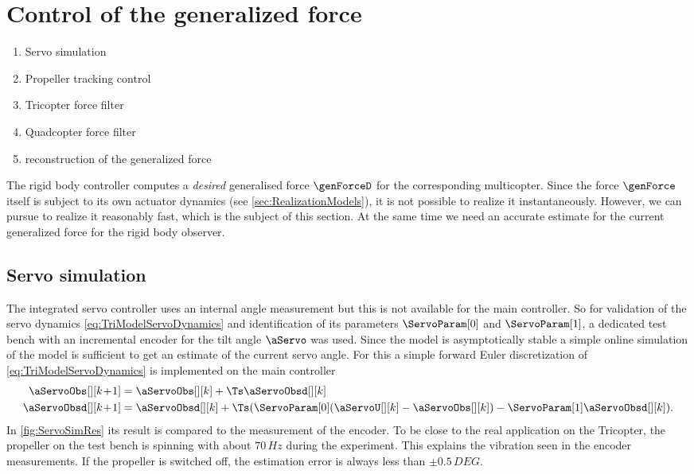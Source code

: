 \section{Control of the generalized force}\label{sec:RealizationForceVectorControl}

\begin{enumerate}
 \item Servo simulation
 \item Propeller tracking control
 \item Tricopter force filter
 \item Quadcopter force filter
 \item reconstruction of the generalized force
\end{enumerate}


The rigid body controller computes a \textit{desired} generalised force $\genForceD$ for the corresponding multicopter.
Since the force $\genForce$ itself is subject to its own actuator dynamics (see \autoref{sec:RealizationModels}), it is not possible to realize it instantaneously.
However, we can pursue to realize it reasonably fast, which is the subject of this section.
At the same time we need an accurate estimate for the current generalized force for the rigid body observer.

\subsection{Servo simulation}
The integrated servo controller uses an internal angle measurement but this is not available for the main controller.
So for validation of the servo dynamics \eqref{eq:TriModelServoDynamics} and identification of its parameters $\ServoParam[0]$ and $\ServoParam[1] $, a dedicated test bench with an incremental encoder for the tilt angle $\aServo$ was used.
Since the model is asymptotically stable a simple online simulation of the model is sufficient to get an estimate of the current servo angle.
For this a simple forward Euler discretization of \eqref{eq:TriModelServoDynamics} is implemented on the main controller
\begin{subequations}\label{eq:ServoSimulator}
\begin{align}
 \aServoObs[][k\!+\!1] &= \aServoObs[][k] + \Ts \aServoObsd[][k]
\\
 \aServoObsd[][k\!+\!1] &= \aServoObsd[][k] + \Ts( \ServoParam[0] (\aServoU[][k] - \aServoObs[][k]) - \ServoParam[1] \aServoObsd[][k])
 .
\end{align}
\end{subequations}
In \autoref{fig:ServoSimRes} its result is compared to the measurement of the encoder.
To be close to the real application on the Tricopter, the propeller on the test bench is spinning with about $70\,\unit{Hz}$ during the experiment.
This explains the vibration seen in the encoder measurements.
If the propeller is switched off, the estimation error is always less than $\pm 0.5\,\unit{DEG}$.

